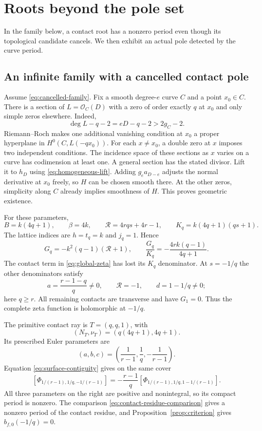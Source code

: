 \documentclass[11pt]{article}
\numberwithin{equation}{section}
\theoremstyle{definition}
\theoremstyle{remark}
\newcommand{\OO}{\mathcal O}
\newcommand{\bfzero}{b_{f,0}}
\begin{document}
\section{Roots beyond the pole set}\label{sec:examples}

In the family below, a contact root has a nonzero period
even though its topological candidate cancels. We then
exhibit an actual pole detected by the curve period.

\subsection{An infinite family with a cancelled contact pole}

Assume \eqref{eq:cancelled-family}. Fix a smooth degree-$e$
curve $C$ and a point $x_0\in C$. There is a section of
$L=\OO_C(D)$ with a zero of order exactly $q$ at $x_0$
and only simple zeros elsewhere. Indeed,
\[
 \deg L-q-2=eD-q-2>2g_C-2.
\]
Riemann--Roch makes one additional vanishing condition
at $x_0$ a proper hyperplane in $H^0(C,L(-qx_0))$.
For each $x\ne x_0$, a double zero at $x$ imposes two
independent conditions. The incidence space of these
sections as $x$ varies on a curve has codimension at least
one. A general section has the stated divisor.
Lift it to $h_D$ using \eqref{eq:homogeneous-lift}.
Adding $g_e a_{D-e}$ adjusts the normal derivative at
$x_0$ freely, so $H$ can be chosen smooth there.
At the other zeros, simplicity along $C$ already implies
smoothness of $H$. This proves geometric existence.

For these parameters,
\[
 B=k(4q+1),\qquad \beta=4k,\qquad
 \mathcal R=4rq s+4r-1,\qquad
 K_q=k(4q+1)(qs+1).
\]
The lattice indices are $h=t_q=k$ and $j_q=1$. Hence
\begin{equation}\label{eq:cancelled-G}
 G_q=-k^2(q-1)(\mathcal R+1),\qquad
 \frac{G_q}{K_q}=-\frac{4rk(q-1)}{4q+1}.
\end{equation}
The contact term in \eqref{eq:global-zeta} has lost its
$K_q$ denominator. At $s=-1/q$ the other denominators
satisfy
\[
 a=\frac{r-1-q}{q}\ne0,\qquad
 \mathcal R=-1,\qquad d=1-1/q\ne0;
\]
here $q\ge r$. All remaining contacts are transverse and
have $G_1=0$. Thus the complete zeta function is
holomorphic at $-1/q$.

The primitive contact ray is
$T=(q,q,1)$, with
\[
 (N_T,\nu_T)=(q(4q+1),4q+1).
\]
Its prescribed Euler parameters are
\[
 (a,b,c)=\left(\frac1{r-1},\frac1q,-\frac1{r-1}\right).
\]
Equation \eqref{eq:surface-contiguity} gives on the same cover
\begin{equation}\label{eq:cancelled-nonzero}
 [\Phi_{1/(r-1),1/q,-1/(r-1)}]
   =-\frac{r-1}{q}
      [\Phi_{1/(r-1),1/q,1-1/(r-1)}].
\end{equation}
All three parameters on the right are positive and
nonintegral, so its compact period is nonzero.
The comparison \eqref{eq:contact-residue-comparison}
gives a nonzero period of the contact residue, and
Proposition~\ref{prop:criterion} gives $\bfzero(-1/q)=0$.
\end{document}
